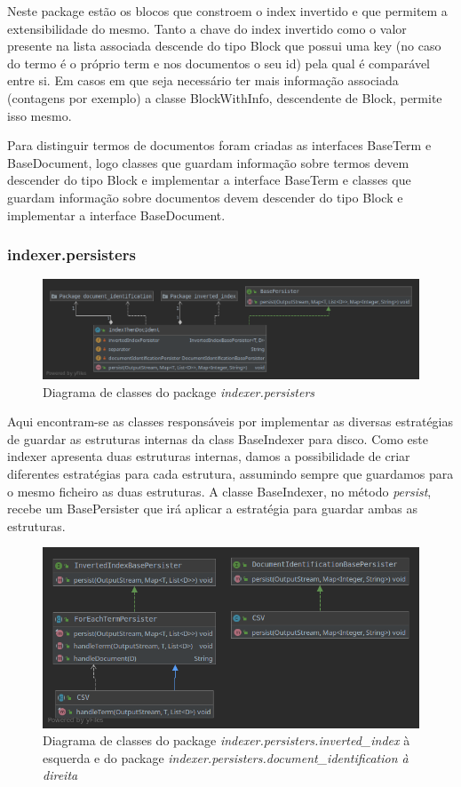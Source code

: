 \documentclass[12pt]{article}
\begin{document}
Neste package estão os blocos que constroem o index invertido e que permitem
a extensibilidade do mesmo. Tanto a chave do index invertido como o valor presente
na lista associada descende do tipo Block que possui uma key (no caso do termo é o
próprio term e nos documentos o seu id) pela qual é comparável entre si. Em casos
em que seja necessário ter mais informação associada (contagens por exemplo)
a classe BlockWithInfo, descendente de Block, permite isso mesmo.

Para distinguir termos de documentos foram criadas as interfaces BaseTerm e BaseDocument,
logo classes que guardam informação sobre termos devem descender do tipo Block e
implementar a interface BaseTerm e classes que guardam informação sobre documentos
devem descender do tipo Block e implementar a interface BaseDocument.

\subsubsection{indexer.persisters}
\begin{figure}[H]
  \center
  \includegraphics[width=16cm]{packages_indexer_persisters.png}
  \caption{Diagrama de classes do package \it indexer.persisters}
\end{figure}

Aqui encontram-se as classes responsáveis por implementar as diversas
estratégias de guardar as estruturas internas da class BaseIndexer
para disco. Como este indexer apresenta duas estruturas internas,
damos a possibilidade de criar diferentes estratégias para cada
estrutura, assumindo sempre que guardamos para o mesmo ficheiro as
duas estruturas. A classe BaseIndexer, no método {\it persist},
recebe um BasePersister que irá aplicar a estratégia para guardar
ambas as estruturas.

\begin{figure}[h]
  \center
  \includegraphics[width=16cm]{packages_indexer_persisters_impl.png}
  \caption{Diagrama de classes do package {\it indexer.persisters.inverted\_index}
  à esquerda e do package \it indexer.persisters.document\_identification
  à direita}
\end{figure}
\end{document}
